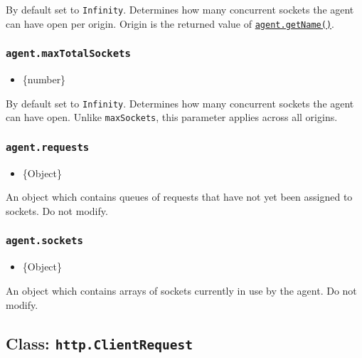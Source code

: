 By default set to \texttt{Infinity}. Determines how many concurrent
sockets the agent can have open per origin. Origin is the returned value
of \hyperref[agentgetnameoptions]{\texttt{agent.getName()}}.

\subsubsection{\texorpdfstring{\texttt{agent.maxTotalSockets}}{agent.maxTotalSockets}}\label{agent.maxtotalsockets}

\begin{itemize}
\tightlist
\item
  \{number\}
\end{itemize}

By default set to \texttt{Infinity}. Determines how many concurrent
sockets the agent can have open. Unlike \texttt{maxSockets}, this
parameter applies across all origins.

\subsubsection{\texorpdfstring{\texttt{agent.requests}}{agent.requests}}\label{agent.requests}

\begin{itemize}
\tightlist
\item
  \{Object\}
\end{itemize}

An object which contains queues of requests that have not yet been
assigned to sockets. Do not modify.

\subsubsection{\texorpdfstring{\texttt{agent.sockets}}{agent.sockets}}\label{agent.sockets}

\begin{itemize}
\tightlist
\item
  \{Object\}
\end{itemize}

An object which contains arrays of sockets currently in use by the
agent. Do not modify.

\subsection{\texorpdfstring{Class:
\texttt{http.ClientRequest}}{Class: http.ClientRequest}}\label{class-http.clientrequest}

